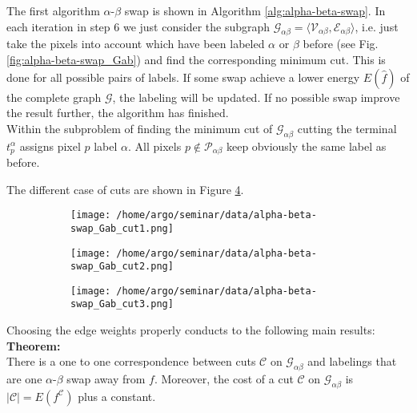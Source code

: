 \documentclass{scrartcl}[12pt, halfparskip]
\begin{document}
The first algorithm $\alpha$-$\beta$ swap is shown in Algorithm \ref{alg:alpha-beta-swap}. In each iteration in step 6 we just consider the subgraph $\mathcal{G}_{\alpha \beta} = \langle \mathcal{V}_{\alpha \beta}, \mathcal{E}_{\alpha \beta} \rangle$, i.e. just take the pixels into account which have been labeled $\alpha$ or $\beta$ before (see Fig. \ref{fig:alpha-beta-swap_Gab}) and find the corresponding minimum cut. This is done for all possible pairs of labels. If some swap achieve a lower energy $E(\hat{f})$ of the complete graph $\mathcal{G}$, the labeling will be updated. If no possible swap improve the result further, the algorithm has finished. \\

Within the subproblem of finding the minimum cut of $\mathcal{G}_{\alpha \beta}$ cutting the terminal $t_p^\alpha$ assigns pixel $p$ label $\alpha$. 
All pixels $p \notin \mathcal{P}_{\alpha \beta}$ keep obviously the same label as before. 


The different case of cuts are shown in Figure \ref{fig:alpha-beta-swap_Gab_cuts}.


\begin{figure}[H]
	\begin{subfigure}{0.32\textwidth}
		\centering
		\texttt{[image: /home/argo/seminar/data/alpha-beta-swap\_Gab\_cut1.png]}
		\caption{}
		\label{fig:alpha-beta-swap_Gab_cut1}
	\end{subfigure}
	\begin{subfigure}{0.32\textwidth}
		\centering
		\texttt{[image: /home/argo/seminar/data/alpha-beta-swap\_Gab\_cut2.png]}
		\caption{}
		\label{fig:alpha-beta-swap_Gab_cut2}
	\end{subfigure}
	\begin{subfigure}{0.32\textwidth}
		\centering
		\texttt{[image: /home/argo/seminar/data/alpha-beta-swap\_Gab\_cut3.png]}
		\caption{}
		\label{fig:alpha-beta-swap_Gab_cut3}
	\end{subfigure}
\caption{}
\label{fig:alpha-beta-swap_Gab_cuts}
\end{figure}


Choosing the edge weights properly conducts to the following main results: \\

\textbf{Theorem:}\\
There is a one to one correspondence between cuts $\mathcal{C}$ on $\mathcal{G}_{\alpha \beta}$ and labelings that are one $\alpha$-$\beta$ swap away from $f$. Moreover, the cost of a cut $\mathcal{C}$ on $\mathcal{G}_{\alpha \beta}$ is $|\mathcal{C}| = E(f^\mathcal{C})$ plus a constant. \\
\end{document}
